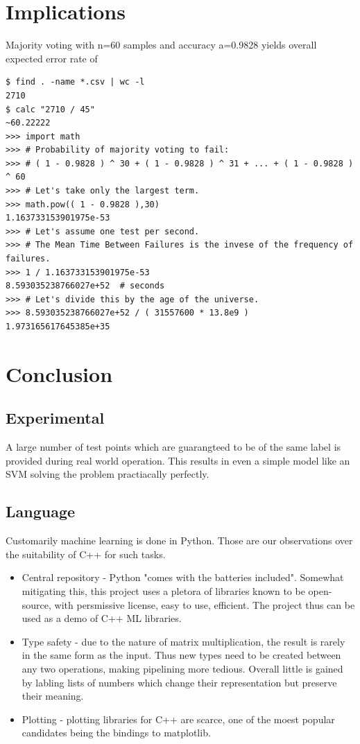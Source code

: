 \documentclass{article}
\begin{document}
\section{Implications}
Majority voting with n=60 samples and accuracy a=0.9828 yields overall expected error rate of
\begin{verbatim}
$ find . -name *.csv | wc -l
2710
$ calc "2710 / 45"
~60.22222
>>> import math
>>> # Probability of majority voting to fail:
>>> # ( 1 - 0.9828 ) ^ 30 + ( 1 - 0.9828 ) ^ 31 + ... + ( 1 - 0.9828 ) ^ 60
>>> # Let's take only the largest term.
>>> math.pow(( 1 - 0.9828 ),30)
1.163733153901975e-53
>>> # Let's assume one test per second.
>>> # The Mean Time Between Failures is the invese of the frequency of failures.
>>> 1 / 1.163733153901975e-53
8.593035238766027e+52  # seconds
>>> # Let's divide this by the age of the universe.
>>> 8.593035238766027e+52 / ( 31557600 * 13.8e9 )
1.973165617645385e+35
\end{verbatim}


\section{Conclusion}
\subsection{Experimental}
A large number of test points which are guarangteed to be of the same label is provided during real world operation.
This results in even a simple model like an SVM solving the problem practiacally perfectly.

\subsection{Language}
Customarily machine learning is done in Python.
Those are our observations over the suitability of C++ for such tasks.
\begin{itemize}
\item{Central repository - Python "comes with the batteries included".
                           Somewhat mitigating this, this project uses a pletora of libraries known to be open-source, with persmissive license, easy to use, efficient.
                           The project thus can be used as a demo of C++ ML libraries.
}
\item{Type safety - due to the nature of matrix multiplication, the result is rarely in the same form as the input.
                    Thus new types need to be created between any two operations, making pipelining more tedious.
                    Overall little is gained by labling lists of numbers which change their representation but preserve their meaning.}
\item{Plotting - plotting libraries for C++ are scarce, one of the moest popular candidates being the bindings to matplotlib.}
\end{itemize}


\printbibliography
\end{document}
